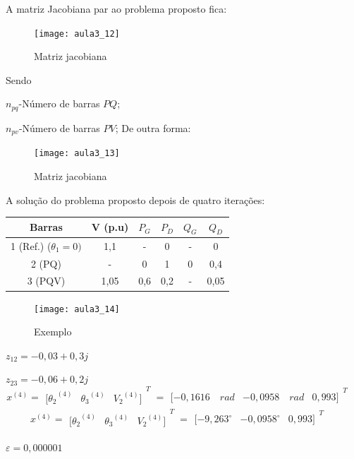 A matriz Jacobiana par ao problema proposto fica:

\begin{figure}[H]
\begin{centering}
\texttt{[image: aula3\_12]}\protect\caption{\label{fig:aula3_12} Matriz jacobiana }
\end{centering}
\end{figure}
Sendo

$n_{pq}$-Número de barras $PQ$;

$n_{pv}$-Número de barras $PV$;
De outra forma:
\begin{figure}[H]
\begin{centering}
\texttt{[image: aula3\_13]}\protect\caption{\label{fig:aula3_13} Matriz jacobiana }
\end{centering}
\end{figure}

A solução do problema proposto depois de quatro iterações:

\begin{tabular}{|c|c|c|c|c|c|}
\hline 
Barras & V (p.u) & $P_{G}$ & $P_{D}$ & $Q_{G}$ & $Q_{D}$\tabularnewline
\hline 
\hline 
1 (Ref.) ($\theta_{1}=0)$ & 1,1 & - & 0 & - & 0\tabularnewline
\hline 
2 (PQ) & - & 0 & 1 & 0 & 0,4\tabularnewline
\hline 
3 (PQV) & 1,05 & 0,6 & 0,2 & - & 0,05\tabularnewline
\hline 
\end{tabular}
\begin{figure}[H]
\begin{centering}
\texttt{[image: aula3\_14]}\protect\caption{\label{fig:aula3_14} Exemplo }
\end{centering}
\end{figure}

$z_{12}=-0,03+0,3j$

$z_{23}=-0,06+0,2j$
\[
{ x }^{ (4) }={ \begin{matrix} { [\theta _{ 2 } }^{ (4) } & { \theta _{ 3 } }^{ (4) } & { V_{ 2 } }^{ (4) }] \end{matrix} }_{ \quad }^{ T }={ \begin{matrix} [-0,1616\quad rad & -0,0958\quad rad & 0,993] \end{matrix} }_{ \quad }^{ T }\quad 
\]
\[
{ x }^{ (4) }={ \begin{matrix} { [\theta _{ 2 } }^{ (4) } & { \theta _{ 3 } }^{ (4) } & { V_{ 2 } }^{ (4) }] \end{matrix} }_{ \quad }^{ T }={ \begin{matrix} [-{ 9,263 }^{ \circ } & { -0,0958 }^{ \circ } & 0,993] \end{matrix} }_{ \quad }^{ T }\quad 
\]

$\varepsilon=0,000001$







